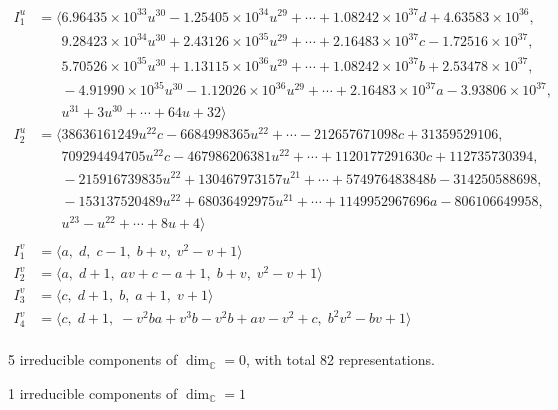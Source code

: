 \documentclass[1p]{elsarticle_modified}
\theoremstyle{definition}
\begin{document}
\begin{align*}
I^u_{1}&=\langle 
6.96435\times10^{33} u^{30}-1.25405\times10^{34} u^{29}+\cdots+1.08242\times10^{37} d+4.63583\times10^{36},\\
\phantom{I^u_{1}}&\phantom{= \langle  }9.28423\times10^{34} u^{30}+2.43126\times10^{35} u^{29}+\cdots+2.16483\times10^{37} c-1.72516\times10^{37},\\
\phantom{I^u_{1}}&\phantom{= \langle  }5.70526\times10^{35} u^{30}+1.13115\times10^{36} u^{29}+\cdots+1.08242\times10^{37} b+2.53478\times10^{37},\\
\phantom{I^u_{1}}&\phantom{= \langle  }-4.91990\times10^{35} u^{30}-1.12026\times10^{36} u^{29}+\cdots+2.16483\times10^{37} a-3.93806\times10^{37},\\
\phantom{I^u_{1}}&\phantom{= \langle  }u^{31}+3 u^{30}+\cdots+64 u+32\rangle \\
I^u_{2}&=\langle 
38636161249 u^{22} c-6684998365 u^{22}+\cdots-212657671098 c+31359529106,\\
\phantom{I^u_{2}}&\phantom{= \langle  }709294494705 u^{22} c-467986206381 u^{22}+\cdots+1120177291630 c+112735730394,\\
\phantom{I^u_{2}}&\phantom{= \langle  }-215916739835 u^{22}+130467973157 u^{21}+\cdots+574976483848 b-314250588698,\\
\phantom{I^u_{2}}&\phantom{= \langle  }-153137520489 u^{22}+68036492975 u^{21}+\cdots+1149952967696 a-806106649958,\\
\phantom{I^u_{2}}&\phantom{= \langle  }u^{23}- u^{22}+\cdots+8 u+4\rangle \\
\\
I^v_{1}&=\langle 
a,\;d,\;c-1,\;b+v,\;v^2- v+1\rangle \\
I^v_{2}&=\langle 
a,\;d+1,\;a v+c- a+1,\;b+v,\;v^2- v+1\rangle \\
I^v_{3}&=\langle 
c,\;d+1,\;b,\;a+1,\;v+1\rangle \\
I^v_{4}&=\langle 
c,\;d+1,\;- v^2 b a+v^3 b- v^2 b+a v- v^2+c,\;b^2 v^2- b v+1\rangle \\
\end{align*}
\raggedright * 5 irreducible components of $\dim_{\mathbb{C}}=0$, with total 82 representations.\\
\raggedright * 1 irreducible components of $\dim_{\mathbb{C}}=1$ \\
\newpage
\renewcommand{\arraystretch}{1}
\end{document}
